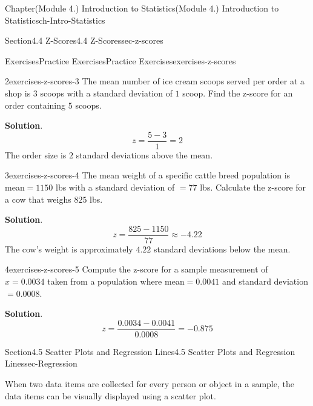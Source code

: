 \documentclass[oneside,10pt,]{book}
\newcommand{\blocktitlefont}{\relax}
\begin{document}
\begin{chapterptx}{Chapter}{(Module 4.) Introduction to Statistics}{}{(Module 4.) Introduction to Statistics}{}{}{ch-Intro-Statistics}
\begin{sectionptx}{Section}{4.4 Z-Scores}{}{4.4 Z-Scores}{}{}{sec-z-scores}
\begin{exercises-subsection-numberless}{Exercises}{Practice Exercises}{}{Practice Exercises}{}{}{exercises-z-scores}
\begin{divisionexercise}{2}{}{}{exercises-z-scores-3}
The mean number of ice cream scoops served per order at a shop is \(3\) scoops with a standard deviation of \(1\) scoop. Find the z-score for an order containing \(5\) scoops.%
\par\smallskip%
\noindent\textbf{\blocktitlefont Solution}.\hypertarget{exercises-z-scores-3-2}{}\quad{}%
\begin{equation*}
z = \frac{5 - 3}{1} = 2
\end{equation*}
The order size is \(2\) standard deviations above the mean.%
\end{divisionexercise}%
\begin{divisionexercise}{3}{}{}{exercises-z-scores-4}%
The mean weight of a specific cattle breed population is mean\(= 1150\) lbs with a standard deviation of \(= 77\) lbs. Calculate the z-score for a cow that weighs \(825\) lbs.%
\par\smallskip%
\noindent\textbf{\blocktitlefont Solution}.\hypertarget{exercises-z-scores-4-2}{}\quad{}%
\begin{equation*}
z = \frac{825 - 1150}{77} \approx -4.22
\end{equation*}
The cow's weight is approximately \(4.22\) standard deviations below the mean.%
\end{divisionexercise}%
\begin{divisionexercise}{4}{}{}{exercises-z-scores-5}%
Compute the z-score for a sample measurement of \(x = 0.0034\) taken from a population where mean\(= 0.0041\) and standard deviation\(= 0.0008\).%
\par\smallskip%
\noindent\textbf{\blocktitlefont Solution}.\hypertarget{exercises-z-scores-5-2}{}\quad{}%
\begin{equation*}
z = \frac{0.0034 - 0.0041}{0.0008} = -0.875
\end{equation*}
%
\end{divisionexercise}%
\end{exercises-subsection-numberless}
\end{sectionptx}
%
%
\typeout{************************************************}
\typeout{************************************************}
%
\begin{sectionptx}{Section}{4.5 Scatter Plots and Regression Lines}{}{4.5 Scatter Plots and Regression Lines}{}{}{sec-Regression}
\begin{introduction}{}%
When two data items are collected for every person or object in a sample, the data items can be visually displayed using a scatter plot.%

\end{introduction}
\end{sectionptx}
\end{chapterptx}
\end{document}
